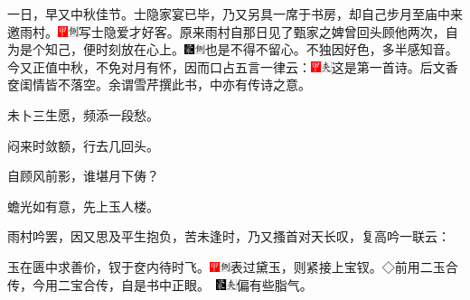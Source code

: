 一日，早又中秋佳节。士隐家宴已毕，乃又另具一席于书房，却自己步月至庙中来邀雨村。{\includegraphics[width=3mm]{../Images/00002}\includegraphics[width=3mm]{../Images/00011}\footnotesize \kaishu 写士隐爱才好客。}原来雨村自那日见了甄家之婢曾回头顾他两次，自为是个知己，便时刻放在心上。{\includegraphics[width=3mm]{../Images/00006}\includegraphics[width=3mm]{../Images/00011}\footnotesize \kaishu 也是不得不留心。不独因好色，多半感知音。}今又正值中秋，不免对月有怀，因而口占五言一律云：{\includegraphics[width=3mm]{../Images/00002}\includegraphics[width=3mm]{../Images/00012}\footnotesize \kaishu 这是第一首诗。后文香奁闺情皆不落空。余谓雪芹撰此书，中亦有传诗之意。}

未卜三生愿，频添一段愁。

闷来时敛额，行去几回头。

自顾风前影，谁堪月下俦？

蟾光如有意，先上玉人楼。

雨村吟罢，因又思及平生抱负，苦未逢时，乃又搔首对天长叹，复高吟一联云：

玉在匮中求善价，钗于奁内待时飞。{{\includegraphics[width=3mm]{../Images/00002}\includegraphics[width=3mm]{../Images/00011}\footnotesize \kaishu 表过黛玉，则紧接上宝钗。◇前用二玉合传，今用二宝合传，自是书中正眼。　}\includegraphics[width=3mm]{../Images/00006}\includegraphics[width=3mm]{../Images/00012}\footnotesize \kaishu 偏有些脂气。}

